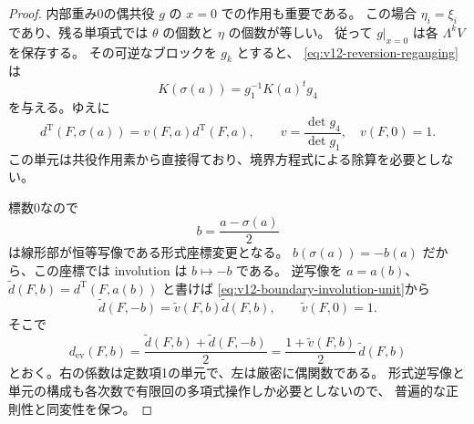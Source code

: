 \begin{proof}
内部重み0の偶共役 $g$ の $x=0$ での作用も重要である。
この場合 $\eta_i=\xi_i$ であり、残る単項式では
$\theta$ の個数と $\eta$ の個数が等しい。
従って $g|_{x=0}$ は各 $\Lambda^kV$ を保存する。
その可逆なブロックを $g_k$ とすると、
\eqref{eq:v12-reversion-regauging}は
\[
 K(\sigma(a))=g_1^{-1}K(a)^t g_4
\]
を与える。ゆえに
\begin{equation}\label{eq:v12-boundary-involution-unit}
 d^{\mathrm T}(F,\sigma(a))
 =v(F,a)d^{\mathrm T}(F,a),\qquad
 v=\frac{\det g_4}{\det g_1},\quad v(F,0)=1.
\end{equation}
この単元は共役作用素から直接得ており、境界方程式による除算を必要としない。

標数0なので
\[
 b=\frac{a-\sigma(a)}2
\]
は線形部が恒等写像である形式座標変更となる。
$b(\sigma(a))=-b(a)$ だから、この座標では involution は $b\mapsto-b$ である。
逆写像を $a=a(b)$、$\widetilde d(F,b)=d^{\mathrm T}(F,a(b))$ と書けば
\eqref{eq:v12-boundary-involution-unit}から
\[
 \widetilde d(F,-b)=\widetilde v(F,b)\widetilde d(F,b),\qquad
 \widetilde v(F,0)=1.
\]
そこで
\begin{equation}\label{eq:v12-even-average}
 d_{\mathrm{ev}}(F,b)
 =\frac{\widetilde d(F,b)+\widetilde d(F,-b)}2
 =\frac{1+\widetilde v(F,b)}2\,\widetilde d(F,b)
\end{equation}
とおく。右の係数は定数項1の単元で、左は厳密に偶関数である。
形式逆写像と単元の構成も各次数で有限回の多項式操作しか必要としないので、
普遍的な正則性と同変性を保つ。
\end{proof}

